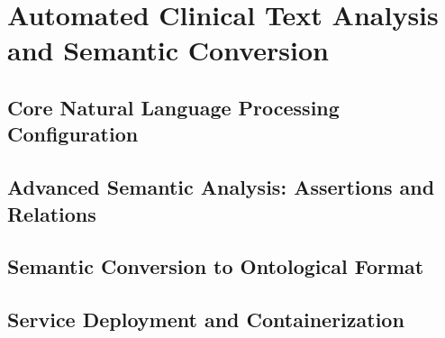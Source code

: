 \documentclass[12pt, a4paper]{article}
\begin{document}
\section{Automated Clinical Text Analysis and Semantic Conversion}
    \subsection{Core Natural Language Processing Configuration}
    \subsection{Advanced Semantic Analysis: Assertions and Relations}
    \subsection{Semantic Conversion to Ontological Format}
    \subsection{Service Deployment and Containerization}
\end{document}
